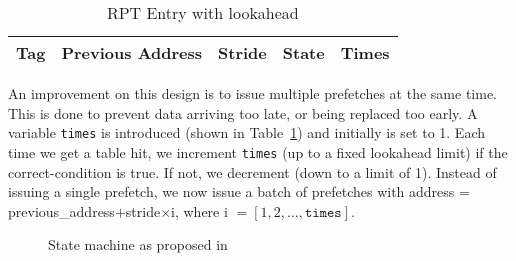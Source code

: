 \begin{table}
  \centering
  \begin{tabular}{ | c | c | c | c | c |}
    \hline
    Tag & Previous Address & Stride & State & Times \\ \hline
  \end{tabular}
  \caption{RPT Entry with lookahead}
  \label{table:entry_la}
\end{table}

An improvement on this design is to issue multiple prefetches at the
same time. This is done to prevent data arriving too late, or being
replaced too early. A variable \texttt{times} is introduced (shown in
Table~\ref{table:entry_la}) and initially is set to 1. Each time we get a table hit, we
increment \texttt{times} (up to a fixed lookahead limit) if the
correct-condition is true. If not, we decrement (down to a limit of
1). Instead of issuing a single prefetch, we now issue a batch of
prefetches with address = previous\_address$ + $stride$\times$i,
where i $= [1, 2, \ldots, \texttt{times}]$.

\begin{figure}[h]
\begin{center}
\caption{State machine as proposed in~\cite{chen_baer_1995}}
\label{figure:statemachine}
\end{center}
\end{figure}
